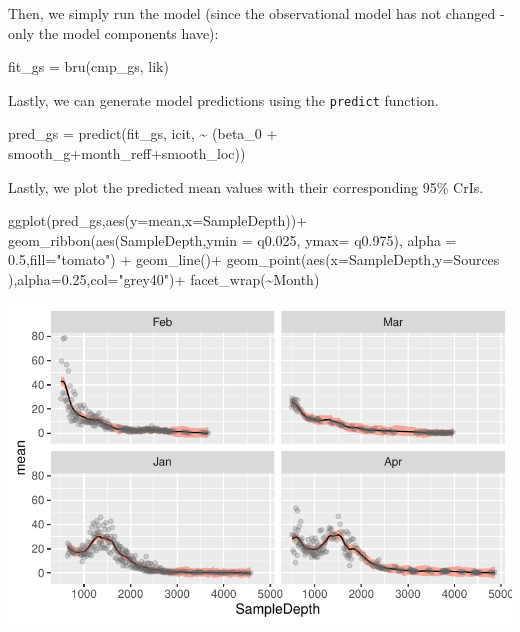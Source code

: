 \documentclass[
  letterpaper,
  DIV=11,
  numbers=noendperiod]{scrartcl}
\newenvironment{Shaded}{\begin{snugshade}}{\end{snugshade}}
\newcommand{\AttributeTok}[1]{\textcolor[rgb]{0.40,0.45,0.13}{#1}}
\newcommand{\FloatTok}[1]{\textcolor[rgb]{0.68,0.00,0.00}{#1}}
\newcommand{\FunctionTok}[1]{\textcolor[rgb]{0.28,0.35,0.67}{#1}}
\newcommand{\NormalTok}[1]{\textcolor[rgb]{0.00,0.23,0.31}{#1}}
\newcommand{\OtherTok}[1]{\textcolor[rgb]{0.00,0.23,0.31}{#1}}
\newcommand{\SpecialCharTok}[1]{\textcolor[rgb]{0.37,0.37,0.37}{#1}}
\newcommand{\StringTok}[1]{\textcolor[rgb]{0.13,0.47,0.30}{#1}}
\begin{document}
Then, we simply run the model (since the observational model has not
changed -only the model components have):

\begin{Shaded}
\begin{Highlighting}[]
\NormalTok{fit\_gs }\OtherTok{=} \FunctionTok{bru}\NormalTok{(cmp\_gs, lik) }
\end{Highlighting}
\end{Shaded}

Lastly, we can generate model predictions using the \texttt{predict}
function.

\begin{Shaded}
\begin{Highlighting}[]
\NormalTok{pred\_gs }\OtherTok{=} \FunctionTok{predict}\NormalTok{(fit\_gs, icit, }\SpecialCharTok{\textasciitilde{}}\NormalTok{ (beta\_0 }\SpecialCharTok{+}\NormalTok{ smooth\_g}\SpecialCharTok{+}\NormalTok{month\_reff}\SpecialCharTok{+}\NormalTok{smooth\_loc))}
\end{Highlighting}
\end{Shaded}

Lastly, we plot the predicted mean values with their corresponding 95\%
CrIs.

\begin{Shaded}
\begin{Highlighting}[]
\FunctionTok{ggplot}\NormalTok{(pred\_gs,}\FunctionTok{aes}\NormalTok{(}\AttributeTok{y=}\NormalTok{mean,}\AttributeTok{x=}\NormalTok{SampleDepth))}\SpecialCharTok{+}
  \FunctionTok{geom\_ribbon}\NormalTok{(}\FunctionTok{aes}\NormalTok{(SampleDepth,}\AttributeTok{ymin =}\NormalTok{ q0}\FloatTok{.025}\NormalTok{, }\AttributeTok{ymax=}\NormalTok{ q0}\FloatTok{.975}\NormalTok{), }\AttributeTok{alpha =} \FloatTok{0.5}\NormalTok{,}\AttributeTok{fill=}\StringTok{"tomato"}\NormalTok{) }\SpecialCharTok{+}
  \FunctionTok{geom\_line}\NormalTok{()}\SpecialCharTok{+}
  \FunctionTok{geom\_point}\NormalTok{(}\FunctionTok{aes}\NormalTok{(}\AttributeTok{x=}\NormalTok{SampleDepth,}\AttributeTok{y=}\NormalTok{Sources ),}\AttributeTok{alpha=}\FloatTok{0.25}\NormalTok{,}\AttributeTok{col=}\StringTok{"grey40"}\NormalTok{)}\SpecialCharTok{+}
  \FunctionTok{facet\_wrap}\NormalTok{(}\SpecialCharTok{\textasciitilde{}}\NormalTok{Month)}
\end{Highlighting}
\end{Shaded}

\includegraphics{day1_practical_2_files/figure-pdf/unnamed-chunk-46-1.pdf}
\end{document}
